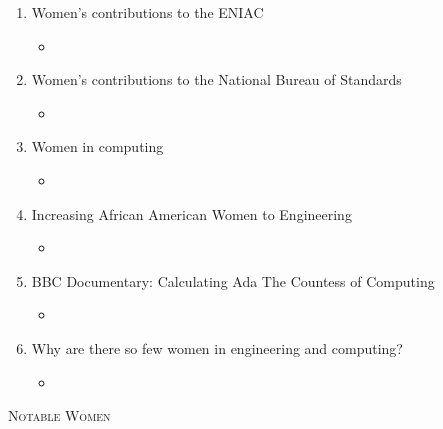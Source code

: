\documentclass[12pt,a4paper]{article}
\begin{document}
\begin{enumerate}
\begin{itemize}
    \item[] 
  \end{itemize}
  \item Women’s contributions to the ENIAC
  \begin{itemize}
    \item[] 
  \end{itemize}
  \item Women’s contributions to the National Bureau of Standards
  \begin{itemize}
    \item[] 
  \end{itemize}
  \item Women in computing
  \begin{itemize}
    \item[] 
  \end{itemize}
  \item Increasing African American Women to Engineering
  \begin{itemize}
    \item[] 
  \end{itemize}
  \item BBC Documentary: Calculating Ada The Countess of Computing
  \begin{itemize}
    \item[] 
  \end{itemize}
  \item Why are there so few women in engineering and computing?
  \begin{itemize}
    \item[] 
  \end{itemize}
\end{enumerate}
  

\clearpage
\begin{center}
  \large\textsc{Notable Women}
\end{center}
\end{document}

